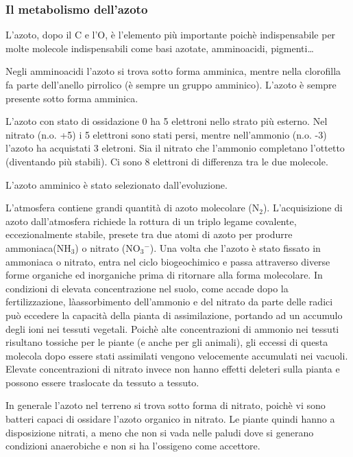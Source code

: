 \documentclass[]{article}
\begin{document}
\subsubsection{Il metabolismo
dell'azoto}\label{il-metabolismo-dellazoto}

L'azoto, dopo il C e l'O, è l'elemento più importante poichè
indispensabile per molte molecole indispensabili come basi azotate,
amminoacidi, pigmenti\ldots{}

Negli amminoacidi l'azoto si trova sotto forma amminica, mentre nella
clorofilla fa parte dell'anello pirrolico (è sempre un gruppo amminico).
L'azoto è sempre presente sotto forma amminica.

L'azoto con stato di ossidazione 0 ha 5 elettroni nello strato più
esterno. Nel nitrato (n.o. +5) i 5 elettroni sono stati persi, mentre
nell'ammonio (n.o. -3) l'azoto ha acquistati 3 eletroni. Sia il nitrato
che l'ammonio completano l'ottetto (diventando più stabili). Ci sono 8
elettroni di differenza tra le due molecole.

L'azoto amminico è stato selezionato dall'evoluzione.

L'atmosfera contiene grandi quantità di azoto molecolare (N$_2$).
L'acquisizione di azoto dall'atmosfera richiede la rottura di un triplo
legame covalente, eccezionalmente stabile, presete tra due atomi di
azoto per produrre ammoniaca(NH$_3$) o nitrato (NO$_3$$^-$). Una volta
che l'azoto è stato fissato in ammoniaca o nitrato, entra nel ciclo
biogeochimico e passa attraverso diverse forme organiche ed inorganiche
prima di ritornare alla forma molecolare. In condizioni di elevata
concentrazione nel suolo, come accade dopo la fertilizzazione,
làassorbimento dell'ammonio e del nitrato da parte delle radici può
eccedere la capacità della pianta di assimilazione, portando ad un
accumulo degli ioni nei tessuti vegetali. Poichè alte concentrazioni di
ammonio nei tessuti risultano tossiche per le piante (e anche per gli
animali), gli eccessi di questa molecola dopo essere stati assimilati
vengono velocemente accumulati nei vacuoli. Elevate concentrazioni di
nitrato invece non hanno effetti deleteri sulla pianta e possono essere
traslocate da tessuto a tessuto.

In generale l'azoto nel terreno si trova sotto forma di nitrato, poichè
vi sono batteri capaci di ossidare l'azoto organico in nitrato. Le
piante quindi hanno a disposizione nitrati, a meno che non si vada nelle
paludi dove si generano condizioni anaerobiche e non si ha l'ossigeno
come accettore.
\end{document}
